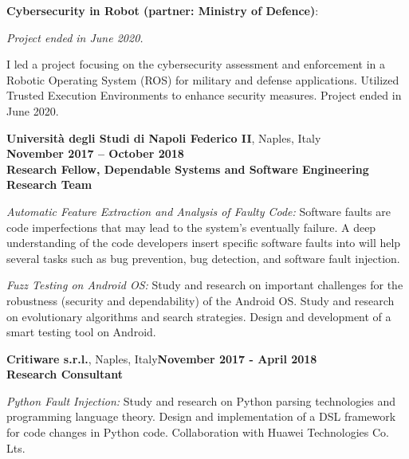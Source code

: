\documentclass[margin,line]{resume}
\begin{document}
\begin{resume}
\begin{list2}
	\item \filbreak\textbf{Cybersecurity in Robot (partner: Ministry of Defence)}: 
	
	\emph{Project ended in June 2020.}	
		
	I led a project focusing on the cybersecurity assessment and enforcement in a Robotic Operating System (ROS) for military and defense applications. Utilized Trusted Execution Environments to enhance security measures. Project ended in June 2020.



\end{list2}



\textbf{Universit\`a degli Studi di Napoli Federico II}, Naples, Italy\\ \phantom{.} \hfill \textbf{November 2017 -- October 2018}\\
\textbf{Research Fellow, Dependable Systems and Software Engineering Research Team}\hfill 
\vspace{-3mm}\\\vspace{-1mm}
\begin{list2}
	\item \filbreak\textit{Automatic Feature Extraction and Analysis of Faulty Code:} Software faults are code imperfections that may lead to the system's eventually failure. A deep understanding of the code developers insert specific software faults into will help several tasks such as bug prevention, bug detection, and software fault injection.
    \item \filbreak\textit{Fuzz Testing on Android OS:} Study and research on important challenges for the robustness (security and dependability) of the Android OS. Study and research on evolutionary algorithms and search strategies. Design and development of a smart testing tool on Android.
\end{list2}

\textbf{Critiware s.r.l.}, Naples, Italy\hfill\textbf{November 2017 - April 2018}\\
\textbf{Research Consultant}\hfill 
\vspace{-3mm}\\\vspace{-1mm}
\begin{list2}
	\item \filbreak\textit{Python Fault Injection:} Study and research on Python parsing technologies and programming language theory. Design and implementation of a DSL framework for code changes in Python code. Collaboration with Huawei Technologies Co. Lts.
\end{list2}


\end{resume}
\end{document}

